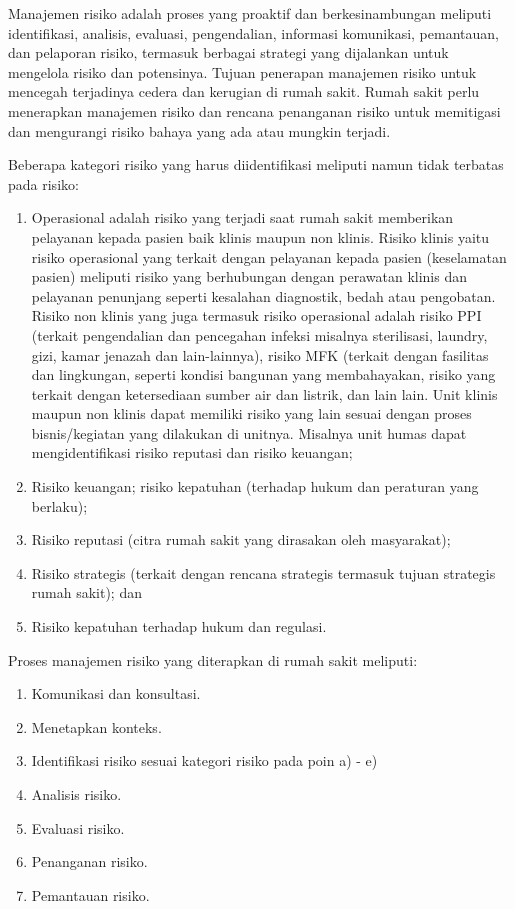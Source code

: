 \documentclass[
]{book}
\providecommand{\tightlist}{%
  \setlength{\itemsep}{0pt}\setlength{\parskip}{0pt}}
\begin{document}
Manajemen risiko adalah proses yang proaktif dan berkesinambungan meliputi identifikasi, analisis, evaluasi, pengendalian, informasi komunikasi, pemantauan, dan pelaporan risiko, termasuk berbagai strategi yang dijalankan untuk mengelola risiko dan potensinya. Tujuan penerapan manajemen risiko untuk mencegah terjadinya cedera dan kerugian di rumah sakit. Rumah sakit perlu menerapkan manajemen risiko dan rencana penanganan risiko untuk memitigasi dan mengurangi risiko bahaya yang ada atau mungkin terjadi.

Beberapa kategori risiko yang harus diidentifikasi meliputi namun tidak terbatas pada risiko:

\begin{enumerate}
\def\labelenumi{\alph{enumi}.}
\item
  Operasional adalah risiko yang terjadi saat rumah sakit memberikan pelayanan kepada pasien baik klinis maupun non klinis.
  Risiko klinis yaitu risiko operasional yang terkait dengan pelayanan kepada pasien (keselamatan pasien) meliputi risiko yang berhubungan dengan perawatan klinis dan pelayanan penunjang seperti kesalahan diagnostik, bedah atau pengobatan.
  Risiko non klinis yang juga termasuk risiko operasional adalah risiko PPI (terkait pengendalian dan pencegahan infeksi misalnya sterilisasi, laundry, gizi, kamar jenazah dan lain-lainnya), risiko MFK (terkait dengan fasilitas dan lingkungan, seperti kondisi bangunan yang membahayakan, risiko yang terkait dengan ketersediaan sumber air dan listrik, dan lain lain. Unit klinis maupun non klinis dapat memiliki risiko yang lain sesuai dengan proses bisnis/kegiatan yang dilakukan di unitnya. Misalnya unit humas dapat mengidentifikasi risiko reputasi dan risiko keuangan;
\item
  Risiko keuangan; risiko kepatuhan (terhadap hukum dan peraturan yang berlaku);
\item
  Risiko reputasi (citra rumah sakit yang dirasakan oleh masyarakat);
\item
  Risiko strategis (terkait dengan rencana strategis termasuk tujuan strategis rumah sakit); dan
\item
  Risiko kepatuhan terhadap hukum dan regulasi.
\end{enumerate}

Proses manajemen risiko yang diterapkan di rumah sakit meliputi:

\begin{enumerate}
\def\labelenumi{\alph{enumi}.}
\tightlist
\item
  Komunikasi dan konsultasi.
\item
  Menetapkan konteks.
\item
  Identifikasi risiko sesuai kategori risiko pada poin a) - e)
\item
  Analisis risiko.
\item
  Evaluasi risiko.
\item
  Penanganan risiko.
\item
  Pemantauan risiko.
\end{enumerate}
\end{document}
